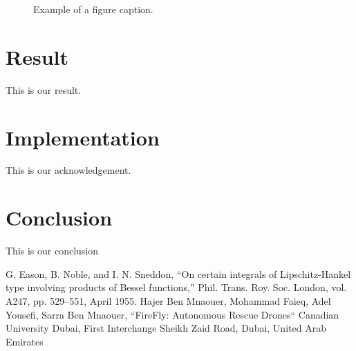\documentclass[conference]{IEEEtran}
\begin{document}
\begin{figure}[htbp]
\centerline{
}
\caption{Example of a figure caption.}
\label{fig}
\end{figure}

\section*{Result}

This is our result.

\section*{Implementation}

This is our acknowledgement.

\section*{Conclusion}

This is our conclusion


\begin{thebibliography}{00}
 G. Eason, B. Noble, and I. N. Sneddon, ``On certain integrals of Lipschitz-Hankel type involving products of Bessel functions,'' Phil. Trans. Roy. Soc. London, vol. A247, pp. 529--551, April 1955.
 Hajer Ben Mnaouer, Mohammad Faieq, Adel Yousefi, Sarra Ben Mnaouer, ``FireFly: Autonomous Rescue Drones`` Canadian University Dubai, First Interchange Sheikh Zaid Road, Dubai, United Arab Emirates
\end{thebibliography}
\end{document}

